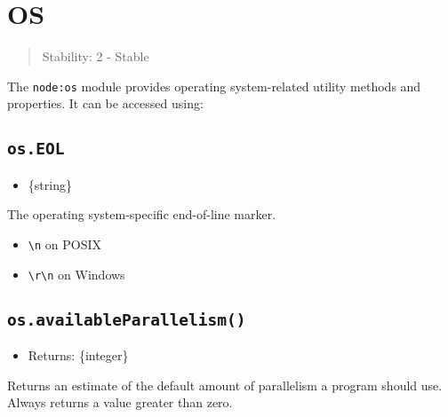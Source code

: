 \section{OS}\label{os}

\begin{quote}
Stability: 2 - Stable
\end{quote}

The \texttt{node:os} module provides operating system-related utility
methods and properties. It can be accessed using:

\begin{Shaded}
\begin{Highlighting}[]
\OperatorTok{=} \NormalTok{(}\NormalTok{)}\OperatorTok{;}
\end{Highlighting}
\end{Shaded}

\subsection{\texorpdfstring{\texttt{os.EOL}}{os.EOL}}\label{os.eol}

\begin{itemize}
\tightlist
\item
  \{string\}
\end{itemize}

The operating system-specific end-of-line marker.

\begin{itemize}
\tightlist
\item
  \texttt{\textbackslash{}n} on POSIX
\item
  \texttt{\textbackslash{}r\textbackslash{}n} on Windows
\end{itemize}

\subsection{\texorpdfstring{\texttt{os.availableParallelism()}}{os.availableParallelism()}}\label{os.availableparallelism}

\begin{itemize}
\tightlist
\item
  Returns: \{integer\}
\end{itemize}

Returns an estimate of the default amount of parallelism a program
should use. Always returns a value greater than zero.

